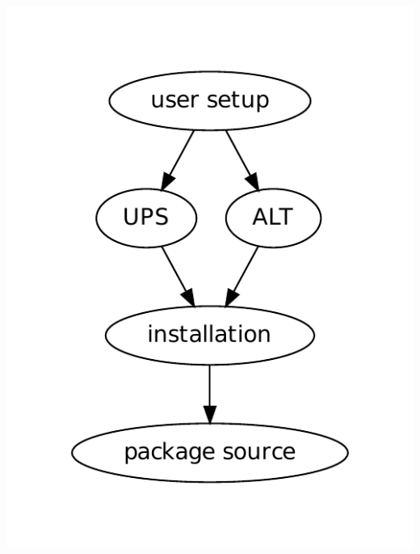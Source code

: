 \documentclass[xcolor=dvipsnames]{beamer}
\begin{document}
\begin{frame}
\begin{columns}
\begin{column}{0.4\paperwidth}
      \includegraphics[width=\textwidth]{worch-deps}
    \end{column}
  \end{columns}
\end{frame}
\end{document}
